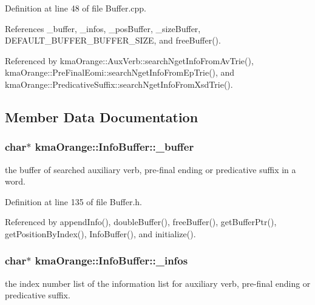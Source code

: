 Definition at line 48 of file Buffer.cpp.

References \_\-buffer, \_\-infos, \_\-posBuffer, \_\-sizeBuffer, DEFAULT\_\-BUFFER\_\-BUFFER\_\-SIZE, and freeBuffer().

Referenced by kmaOrange::AuxVerb::searchNgetInfoFromAvTrie(), kmaOrange::PreFinalEomi::searchNgetInfoFromEpTrie(), and kmaOrange::PredicativeSuffix::searchNgetInfoFromXsdTrie().

\subsection{Member Data Documentation}
\hypertarget{classkmaOrange_1_1InfoBuffer_5582be7ee4e83958d9e30e82f185a1f3}{
\subsubsection[{\_\-buffer}]{\setlength{\rightskip}{0pt plus 5cm}char$\ast$ {\bf kmaOrange::InfoBuffer::\_\-buffer}}}
\label{classkmaOrange_1_1InfoBuffer_5582be7ee4e83958d9e30e82f185a1f3}


the buffer of searched auxiliary verb, pre-final ending or predicative suffix in a word. 



Definition at line 135 of file Buffer.h.

Referenced by appendInfo(), doubleBuffer(), freeBuffer(), getBufferPtr(), getPositionByIndex(), InfoBuffer(), and initialize().\hypertarget{classkmaOrange_1_1InfoBuffer_8906a23d3b955cf8d7ecdab1af9ab05f}{
\subsubsection[{\_\-infos}]{\setlength{\rightskip}{0pt plus 5cm}char$\ast$ {\bf kmaOrange::InfoBuffer::\_\-infos}}}
\label{classkmaOrange_1_1InfoBuffer_8906a23d3b955cf8d7ecdab1af9ab05f}


the index number list of the information list for auxiliary verb, pre-final ending or predicative suffix. 



